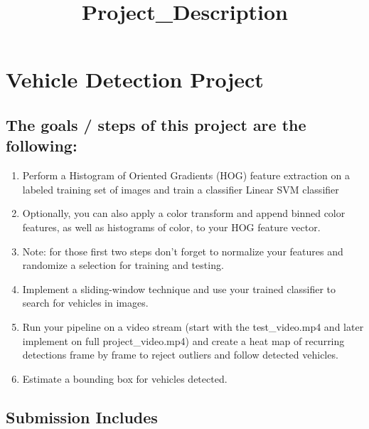 \documentclass[11pt]{article}
\title{Project\_Description}
\providecommand{\tightlist}{%
      \setlength{\itemsep}{0pt}\setlength{\parskip}{0pt}}
\begin{document}
    
    
    \maketitle
    
    

    
    \hypertarget{vehicle-detection-project}{%
\section{Vehicle Detection Project}\label{vehicle-detection-project}}

\hypertarget{the-goals-steps-of-this-project-are-the-following}{%
\subsection{The goals / steps of this project are the
following:}\label{the-goals-steps-of-this-project-are-the-following}}

\begin{enumerate}
\def\labelenumi{\arabic{enumi}.}
\tightlist
\item
  Perform a Histogram of Oriented Gradients (HOG) feature extraction on
  a labeled training set of images and train a classifier Linear SVM
  classifier
\item
  Optionally, you can also apply a color transform and append binned
  color features, as well as histograms of color, to your HOG feature
  vector.
\item
  Note: for those first two steps don't forget to normalize your
  features and randomize a selection for training and testing.
\item
  Implement a sliding-window technique and use your trained classifier
  to search for vehicles in images.
\item
  Run your pipeline on a video stream (start with the test\_video.mp4
  and later implement on full project\_video.mp4) and create a heat map
  of recurring detections frame by frame to reject outliers and follow
  detected vehicles.
\item
  Estimate a bounding box for vehicles detected.
\end{enumerate}

    \hypertarget{submission-includes}{%
\subsection{Submission Includes}\label{submission-includes}}
\end{document}
